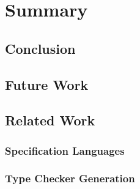 \chapter{Summary}
\section{Conclusion}
\section{Future Work}
\section{Related Work}
\subsection{Specification Languages}
\subsection{Type Checker Generation}

